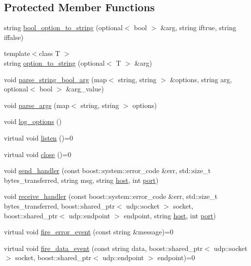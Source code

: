 \subsection*{Protected Member Functions}
\begin{DoxyCompactItemize}
\item 
string \hyperlink{classUdp_a5fd51bb7cc419e81b873053d7e6b262f}{bool\_\-option\_\-to\_\-string} (optional$<$ bool $>$ \&arg, string iftrue, string iffalse)
\item 
{\footnotesize template$<$class T $>$ }\\string \hyperlink{classUdp_afefa55570fcf5adc18fc131437f31390}{option\_\-to\_\-string} (optional$<$ T $>$ \&arg)
\item 
void \hyperlink{classUdp_ab1af87966ec4c68e8958844f95a75e47}{parse\_\-string\_\-bool\_\-arg} (map$<$ string, string $>$ \&options, string arg, optional$<$ bool $>$ \&arg\_\-value)
\item 
void \hyperlink{classUdp_a19fe0f8b3b2f75cee6ae2841b032c64e}{parse\_\-args} (map$<$ string, string $>$ options)
\item 
void \hyperlink{classUdp_aa3def7bb682cc264bb2e425d93517e17}{log\_\-options} ()
\item 
virtual void \hyperlink{classUdp_a645a7a67007362e349cacc78f9870954}{listen} ()=0
\item 
virtual void \hyperlink{classUdp_a035ec772c3af57eba9d69cf3ba9dcdda}{close} ()=0
\item 
void \hyperlink{classUdp_a8c7b302089f5dd3979b5e1572b190ca8}{send\_\-handler} (const boost::system::error\_\-code \&err, std::size\_\-t bytes\_\-transferred, string msg, string \hyperlink{classUdp_a798fd48815d9d97045e8e6a3a290d301}{host}, int \hyperlink{classUdp_af69ea781b31a1fa62e5d3012b6288dc8}{port})
\item 
void \hyperlink{classUdp_a1edcafcfd4202b3f9cc5a0724f26fe7a}{receive\_\-handler} (const boost::system::error\_\-code \&err, std::size\_\-t bytes\_\-transferred, boost::shared\_\-ptr$<$ udp::socket $>$ socket, boost::shared\_\-ptr$<$ udp::endpoint $>$ endpoint, string \hyperlink{classUdp_a798fd48815d9d97045e8e6a3a290d301}{host}, int \hyperlink{classUdp_af69ea781b31a1fa62e5d3012b6288dc8}{port})
\item 
virtual void \hyperlink{classUdp_a9b79c3603ee9196623aa93b505bda1f6}{fire\_\-error\_\-event} (const string \&message)=0
\item 
virtual void \hyperlink{classUdp_a08e6e588781ce1e7a4d643b97d63dc5c}{fire\_\-data\_\-event} (const string data, boost::shared\_\-ptr$<$ udp::socket $>$ socket, boost::shared\_\-ptr$<$ udp::endpoint $>$ endpoint)=0
\end{DoxyCompactItemize}
